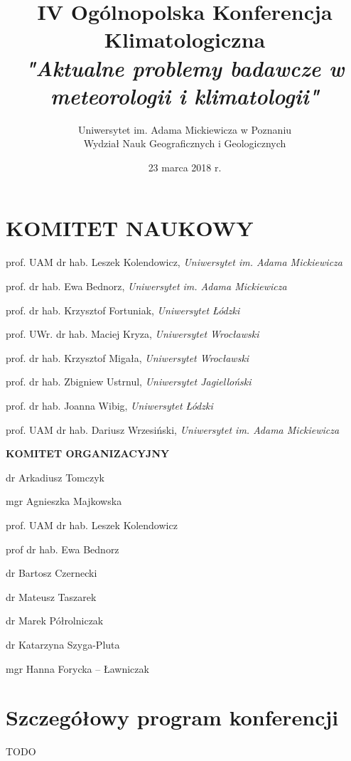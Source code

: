 \documentclass[12pt,oneside]{book}
\title{IV Ogólnopolska Konferencja Klimatologiczna \\ \emph{"Aktualne problemy badawcze w meteorologii i klimatologii"}}
\date{23 marca 2018 r.}
\author{Uniwersytet im. Adama Mickiewicza w Poznaniu\\Wydział Nauk Geograficznych i Geologicznych}
\begin{document}
% 

\frontmatter
\maketitle

\chapter*{KOMITET NAUKOWY}
\vspace{-0.5cm}
prof. UAM dr hab. Leszek Kolendowicz, \textit{Uniwersytet im. Adama Mickiewicza}

prof. dr hab. Ewa Bednorz, \textit{Uniwersytet im. Adama Mickiewicza}

prof. dr hab. Krzysztof Fortuniak,  \textit{Uniwersytet Łódzki}

prof. UWr. dr hab. Maciej Kryza, \textit{Uniwersytet Wrocławski}

prof. dr hab. Krzysztof Migała,  \textit{Uniwersytet Wrocławski}

prof. dr hab. Zbigniew Ustrnul,  \textit{Uniwersytet Jagielloński}

prof. dr hab. Joanna Wibig, \textit{Uniwersytet Łódzki}

prof. UAM dr hab. Dariusz Wrzesiński, \textit{Uniwersytet im. Adama Mickiewicza}


\vspace{2cm}
\Large{\textbf{KOMITET ORGANIZACYJNY}}
\vspace{0.5cm}

\normalsize dr Arkadiusz Tomczyk

mgr Agnieszka Majkowska

prof. UAM dr hab. Leszek Kolendowicz

prof dr hab. Ewa Bednorz

dr Bartosz Czernecki

dr Mateusz Taszarek

dr Marek Półrolniczak

dr Katarzyna Szyga-Pluta

mgr Hanna Forycka -- Ławniczak


\chapter{Szczegółowy program konferencji }
TODO
%
\end{document}
